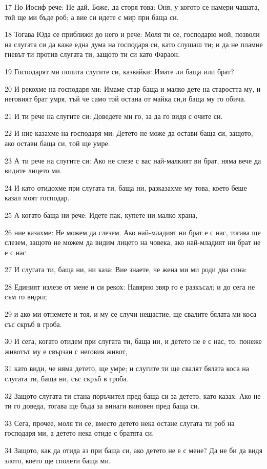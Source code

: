\par 17 Но Иосиф рече: Не дай, Боже, да сторя това: Оня, у когото се намери чашата, той ще ми бъде роб; а вие си идете с мир при баща си.
\par 18 Тогава Юда се приближи до него и рече: Моля ти се, господарю мой, позволи на слугата си да каже една дума на господаря си, като слушаш ти; и да не пламне гневът ти против слугата ти, защото ти си като Фараон.
\par 19 Господарят ми попита слугите си, казвайки: Имате ли баща или брат?
\par 20 И рекохме на господаря ми: Имаме стар баща и малко дете на старостта му, и неговият брат умря, тъй че само той остана от майка си,и баща му го обича.
\par 21 И ти рече на слугите си: Доведете ми го, за да го видя с очите си.
\par 22 И ние казахме на господаря ми: Детето не може да остави баща си, защото, ако остави баща си, той ще умре.
\par 23 А ти рече на слугите си: Ако не слезе с вас най-малкият ви брат, няма вече да видите лицето ми.
\par 24 И като отидохме при слугата ти, баща ни, разказахме му това, което беше казал моят господар.
\par 25 А когато баща ни рече: Идете пак, купете ни малко храна,
\par 26 ние казахме: Не можем да слезем. Ако най-младият ни брат е с нас, тогава ще слезем, защото не можем да видим лицето на човека, ако най-младият ни брат не е с нас.
\par 27 И слугата ти, баща ни, ни каза: Вие знаете, че жена ми ми роди два сина:
\par 28 Единият излезе от мене и си рекох: Навярно звяр го е разкъсал; и до сега не съм го видял;
\par 29 и ако ми отнемете и тоя, и му се случи нещастие, ще свалите бялата ми коса със скръб в гроба.
\par 30 И сега, когато отидем при слугата ти, баща ни, и детето не е с нас, то, понеже животът му е свързан с неговия живот,
\par 31 като види, че няма детето, ще умре; и слугите ти ще свалят бялата коса на слугата ти, баща ни, със скръб в гроба.
\par 32 Защото слугата ти стана поръчител пред баща си за детето, като казах: Ако не ти го доведа, тогава ще бъда за винаги виновен пред баща си.
\par 33 Сега, прочее, моля ти се, вместо детето нека остане слугата ти роб на господаря ми, а детето нека отиде с братята си.
\par 34 Защото, как да отида аз при баща си, ако детето не е с мене? Да не би да видя злото, което ще сполети баща ми.


